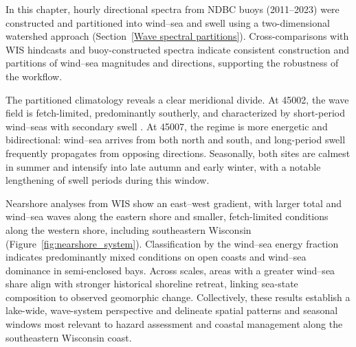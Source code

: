 In this chapter, hourly directional spectra from NDBC buoys (2011–2023) were
constructed and partitioned into wind–sea and swell using a two-dimensional
watershed approach (Section~\ref{Wave spectral partitions}). Cross-comparisons
with WIS hindcasts and buoy-constructed spectra indicate consistent construction
and partitions of wind–sea magnitudes and directions, supporting the robustness
of the workflow.

The partitioned climatology reveals a clear meridional divide. At 45002, the
wave field is fetch-limited, predominantly southerly, and characterized by
short-period wind–seas with secondary swell . At 45007, the regime is more energetic and
bidirectional: wind–sea arrives from both north and south, and long-period swell
frequently propagates from opposing directions. Seasonally,
both sites are calmest in summer and intensify into late autumn and early
winter, with a notable lengthening of swell periods during this window.

Nearshore analyses from WIS show an east–west gradient, with larger total and
wind–sea waves along the eastern shore and smaller, fetch-limited conditions
along the western shore, including southeastern Wisconsin
(Figure~\ref{fig:nearshore_system}). Classification by the wind–sea energy
fraction indicates predominantly mixed conditions on open coasts and wind–sea
dominance in semi-enclosed bays. Across scales, areas with a greater wind–sea
share align with stronger historical shoreline retreat, linking sea-state
composition to observed geomorphic change. Collectively, these results establish
a lake-wide, wave-system perspective and delineate spatial patterns and seasonal
windows most relevant to hazard assessment and coastal management along the
southeastern Wisconsin coast.

